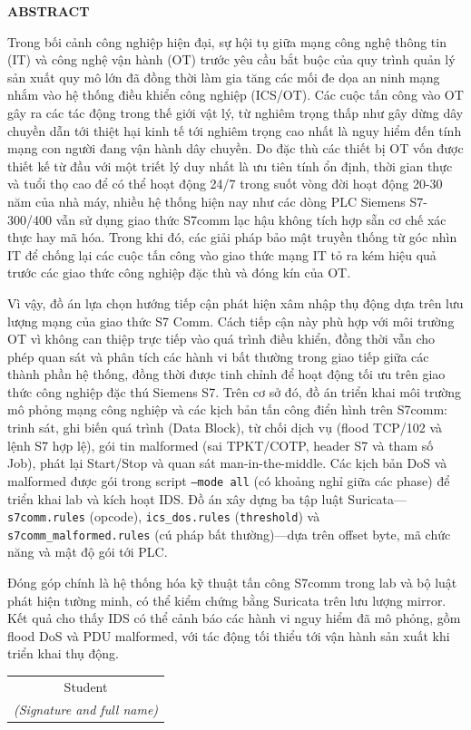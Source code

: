 \documentclass[../main.tex]{subfiles}
\begin{document}
\begin{center}
    \Large{\textbf{ABSTRACT}}\\
\end{center}
\vspace{1cm}

Trong bối cảnh công nghiệp hiện đại, sự hội tụ giữa mạng công nghệ thông tin (IT) và công nghệ vận hành (OT) trước yêu cầu bắt buộc của quy trình quản lý sản xuất quy mô lớn đã đồng thời làm gia tăng các mối đe dọa an ninh mạng nhắm vào hệ thống điều khiển công nghiệp (ICS/OT). Các cuộc tấn công vào OT gây ra các tác động trong thế giới vật lý, từ nghiêm trọng thấp như gây dừng dây chuyền dẫn tới thiệt hại kinh tế tới nghiêm trọng cao nhất là nguy hiểm đến tính mạng con người đang vận hành dây chuyền. Do đặc thù các thiết bị OT vốn được thiết kế từ đầu với một triết lý duy nhất là ưu tiên tính ổn định, thời gian thực và tuổi thọ cao để có thể hoạt động 24/7 trong suốt vòng đời hoạt động 20-30 năm của nhà máy, nhiều hệ thống hiện nay như các dòng PLC Siemens S7-300/400 vẫn sử dụng giao thức S7comm lạc hậu không tích hợp sẵn cơ chế xác thực hay mã hóa. Trong khi đó, các giải pháp bảo mật truyền thống từ góc nhìn IT để chống lại các cuộc tấn công vào giao thức mạng IT tỏ ra kém hiệu quả trước các giao thức công nghiệp đặc thù và đóng kín của OT.

Vì vậy, đồ án lựa chọn hướng tiếp cận phát hiện xâm nhập thụ động dựa trên lưu lượng mạng của giao thức S7 Comm. Cách tiếp cận này phù hợp với môi trường OT vì không can thiệp trực tiếp vào quá trình điều khiển, đồng thời vẫn cho phép quan sát và phân tích các hành vi bất thường trong giao tiếp giữa các thành phần hệ thống, đồng thời được tinh chỉnh để hoạt động tối ưu trên giao thức công nghiệp đặc thú Siemens S7. Trên cơ sở đó, đồ án triển khai môi trường mô phỏng mạng công nghiệp và các kịch bản tấn công điển hình trên S7comm: trinh sát, ghi biến quá trình (Data Block), từ chối dịch vụ (flood TCP/102 và lệnh S7 hợp lệ), gói tin malformed (sai TPKT/COTP, header S7 và tham số Job), phát lại Start/Stop và quan sát man-in-the-middle. Các kịch bản DoS và malformed được gói trong script \texttt{--mode all} (có khoảng nghỉ giữa các phase) để triển khai lab và kích hoạt IDS. Đồ án xây dựng ba tập luật Suricata---\texttt{s7comm.rules} (opcode), \texttt{ics\_dos.rules} (\texttt{threshold}) và \texttt{s7comm\_malformed.rules} (cú pháp bất thường)---dựa trên offset byte, mã chức năng và mật độ gói tới PLC.

Đóng góp chính là hệ thống hóa kỹ thuật tấn công S7comm trong lab và bộ luật phát hiện tường minh, có thể kiểm chứng bằng Suricata trên lưu lượng mirror. Kết quả cho thấy IDS có thể cảnh báo các hành vi nguy hiểm đã mô phỏng, gồm flood DoS và PDU malformed, với tác động tối thiểu tới vận hành sản xuất khi triển khai thụ động.

\begin{flushright}
\begin{tabular}{@{}c@{}}
Student\\
\textit{(Signature and full name)}
\end{tabular}
\end{flushright}
\end{document}
